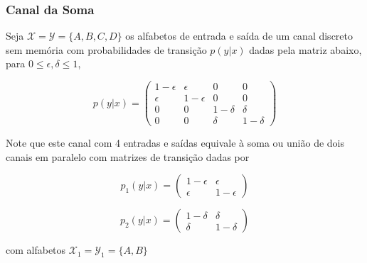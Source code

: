 \begin{frame}[allowframebreaks]
  \frametitle{Canal da Soma}
  \begin{exercise}
  Seja $\mathcal{X} = \mathcal{Y} = \{A,B,C,D\}$ os alfabetos de entrada e saída de um
  canal discreto sem memória com probabilidades de transição $p(y|x)$ dadas pela matriz abaixo,
  para $0 \leq \epsilon , \delta \leq 1$,

  \begin{equation}
  p(y|x) = 
  \begin{pmatrix}
  1-\epsilon & \epsilon & 0 & 0 \\
  \epsilon & 1-\epsilon & 0 & 0 \\
  0 & 0 & 1 - \delta & \delta \\
  0 & 0 & \delta & 1 - \delta
  \end{pmatrix}
  \end{equation}

  \exercisebreak

  Note que este canal com 4 entradas e saídas equivale à soma ou união de dois canais
  em paralelo com matrizes de transição dadas por

  \noindent\begin{minipage}{.5\linewidth}
  \begin{equation}
  p_1(y|x) = \begin{pmatrix} 1-\epsilon & \epsilon \\ \epsilon & 1-\epsilon \end{pmatrix}
  \end{equation}
  \end{minipage}%
  \begin{minipage}{.5\linewidth}
  \begin{equation} 
  p_2(y|x) = \begin{pmatrix}  1 - \delta & \delta \\ \delta & 1 - \delta \end{pmatrix}
  \end{equation}
  \end{minipage}

  com alfabetos $\mathcal{X}_1 = \mathcal{Y}_1 = \{A,B\}$ 



\end{exercise}
\end{frame}
